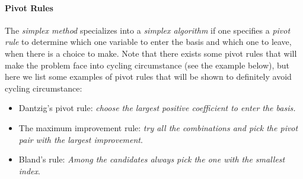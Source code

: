 \paragraph{Pivot Rules}
The \emph{simplex method} specializes into a \emph{simplex algorithm} if one specifies a \emph{pivot rule} to determine which one variable to enter the basis and which one to leave, when there is a choice to make. Note that there exists some pivot rules that will make the problem face into cycling circumstance (see the example below), but here we list some examples of pivot rules that will be shown to definitely avoid cycling circumstance:
\begin{itemize}
\item
Dantzig’s pivot rule: \emph{choose the largest positive coefficient to enter the basis.}
\item
The maximum improvement rule: \emph{try all the combinations and pick the pivot pair with the largest improvement}.
\item
Bland's rule: \emph{Among the candidates always pick the one with the smallest index}.
\end{itemize}

